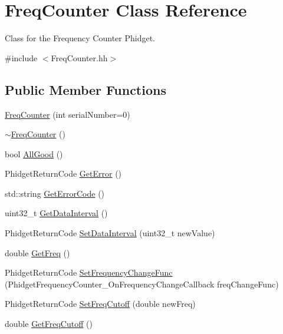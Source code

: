 \hypertarget{classFreqCounter}{}\section{Freq\+Counter Class Reference}
\label{classFreqCounter}


Class for the Frequency Counter Phidget.  




{\ttfamily \#include $<$Freq\+Counter.\+hh$>$}

\subsection*{Public Member Functions}
\begin{DoxyCompactItemize}
\item 
\hyperlink{classFreqCounter_ae1d5cc07e50abac7c5a2bbb10da2bb13}{Freq\+Counter} (int serial\+Number=0)
\item 
\hyperlink{classFreqCounter_aa4ab538cf30bdaeb27d4da0a934cb62e}{$\sim$\+Freq\+Counter} ()
\item 
bool \hyperlink{classFreqCounter_a49d710c33596f4041ecc46883dfc6d5a}{All\+Good} ()
\item 
Phidget\+Return\+Code \hyperlink{classFreqCounter_a2ede581f4092d38deaf64955380ec77a}{Get\+Error} ()
\item 
std\+::string \hyperlink{classFreqCounter_a871e331baa9ea906213ccd4a9dac272f}{Get\+Error\+Code} ()
\item 
uint32\+\_\+t \hyperlink{classFreqCounter_aab820d1ad9c18aa299667610aba8647e}{Get\+Data\+Interval} ()
\item 
Phidget\+Return\+Code \hyperlink{classFreqCounter_a144146cca0604f0f6ce61297c8d36026}{Set\+Data\+Interval} (uint32\+\_\+t new\+Value)
\item 
double \hyperlink{classFreqCounter_a07abdc2bc8a2cff4cf7276085d700b65}{Get\+Freq} ()
\item 
Phidget\+Return\+Code \hyperlink{classFreqCounter_aac2f6e513119aaf984fce1a0100833c9}{Set\+Frequency\+Change\+Func} (Phidget\+Frequency\+Counter\+\_\+\+On\+Frequency\+Change\+Callback freq\+Change\+Func)
\item 
Phidget\+Return\+Code \hyperlink{classFreqCounter_a6a5957e994246be1f2b9a6dcca125d0e}{Set\+Freq\+Cutoff} (double new\+Freq)
\item 
double \hyperlink{classFreqCounter_acdaf2ade3385851d88dcc69d4107aded}{Get\+Freq\+Cutoff} ()
\end{DoxyCompactItemize}


